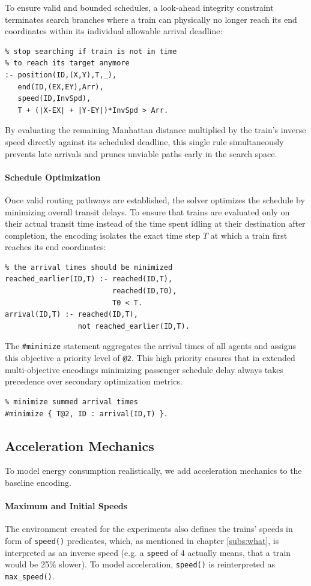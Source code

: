 To ensure valid and bounded schedules, a look-ahead integrity constraint terminates search branches where a train can physically no longer reach its end coordinates within its individual allowable arrival deadline:
\begin{verbatim}
% stop searching if train is not in time
% to reach its target anymore
:- position(ID,(X,Y),T,_),
   end(ID,(EX,EY),Arr),
   speed(ID,InvSpd),
   T + (|X-EX| + |Y-EY|)*InvSpd > Arr.
\end{verbatim}
By evaluating the remaining Manhattan distance multiplied by the train's inverse speed directly against its scheduled deadline, this single rule simultaneously prevents late arrivals and prunes unviable paths early in the search space.

\paragraph{Schedule Optimization}
Once valid routing pathways are established, the solver optimizes the schedule by minimizing overall transit delays. To ensure that trains are evaluated only on their actual transit time instead of the time spent idling at their destination after completion, the encoding isolates the exact time step $T$ at which a train first reaches its end coordinates:
\begin{verbatim}
% the arrival times should be minimized
reached_earlier(ID,T) :- reached(ID,T),
                         reached(ID,T0),
                         T0 < T.
arrival(ID,T) :- reached(ID,T),
                 not reached_earlier(ID,T).
\end{verbatim}

The \texttt{\#minimize} statement aggregates the arrival times of all agents and assigns this objective a priority level of \texttt{@2}. This high priority ensures that in extended multi-objective encodings minimizing passenger schedule delay always takes precedence over secondary optimization metrics.
\begin{verbatim}
% minimize summed arrival times
#minimize { T@2, ID : arrival(ID,T) }.
\end{verbatim}

\subsection{Acceleration Mechanics}
To model energy consumption realistically, we add acceleration mechanics to the baseline encoding.

\paragraph{Maximum and Initial Speeds}
The environment created for the experiments also defines the trains' speeds in form of \texttt{speed()} predicates, which, as mentioned in chapter \ref{subs:what}, is interpreted as an inverse speed (e.g. a \texttt{speed} of 4 actually means, that a train would be 25\% slower). To model acceleration, \texttt{speed()} is reinterpreted as \texttt{max\_speed()}.

